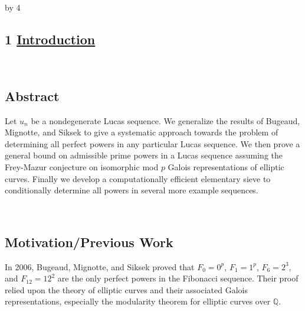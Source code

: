 \documentclass[12pt]{scrartcl}
\def\Q{{\mathbb Q}}
\def\anzspalten{4}
\newlength{\kastenwidth}
\newenvironment{kasten}{%
  \begin{lrbox}{\dummybox}%
    \begin{minipage}{0.96\linewidth}}%
    {\end{minipage}%
  \end{lrbox}%
  \raisebox{-\depth}{\psshadowbox[framesep=1em]{\usebox{\dummybox}}}\\[0.5em]}
\newenvironment{spalte}{%
  \setlength\kastenwidth{1.2\textwidth}
  \divide\kastenwidth by \anzspalten
  \begin{minipage}[t]{\kastenwidth}}{\end{minipage}\hfill}
\begin{document}
\begin{lrbox}{\spalten}
  \parbox[t][\textheight]{1.3\textwidth}{%
    \hfill
    \begin{spalte}
\vspace{-2.71in}
      \begin{kasten}
\section*{1 \hspace{0.1cm} {\color{red} \underline{Introduction}}}
\end{kasten}

\begin{kasten}
\subsection*{\color{blue} Abstract}
{
Let $u_n$ be a nondegenerate Lucas sequence.  We generalize the results of Bugeaud, Mignotte, and Siksek \cite{siksek06} to give a systematic approach towards the problem of determining all perfect powers in any particular Lucas sequence.  We then prove a general bound on admissible prime powers in a Lucas sequence assuming the Frey-Mazur conjecture on isomorphic mod $p$ Galois representations of elliptic curves.  Finally we develop a computationally efficient elementary sieve to conditionally determine all powers in several more example sequences.
} 
\end{kasten}

\begin{kasten}

\subsection*{\color{blue} Motivation/Previous Work}
In 2006, Bugeaud, Mignotte, and Siksek proved that
$F_0=0^p$, $F_1=1^p$, $F_6=2^3$, and $F_{12} = 12^2$ are the only perfect powers in the Fibonacci sequence.  Their proof relied upon the theory of elliptic curves and their associated Galois representations, especially the modularity theorem for elliptic curves over $\Q$.

\end{kasten}

\begin{kasten}


\end{kasten}
\end{spalte}}
\end{lrbox}
\end{document}
